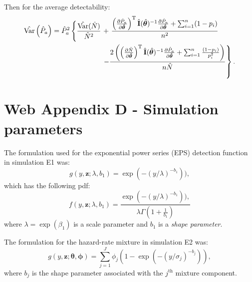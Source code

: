 \documentclass{report}
\begin{document}
Then for the average detectability:
\begin{align*}
\hat{\text{Var}}\left( \hat{P}_a \right) = \hat{P}_a^2\left\{ \vphantom{\frac{\frac{a}{b}^b}{b}} \frac{\hat{\text{Var}}(\hat{N})}{\hat{N}^2}\right. &+\left.\frac{\left(\frac{\partial \hat{P}_a}{\partial\bm{\hat{\theta}}}\right)^\text{T}\hat{\mathbf{I}}(\hat{\bm{\theta}})^{-1}\frac{\partial \hat{P}_a}{\partial\bm{\hat{\theta}}}+\sum_{i=1}^n (1-p_i)}{n^2} \right. \\
 & \left. - \frac{2\left(\left(\frac{\partial \hat{N}}{\partial\bm{\hat{\theta}}}\right)^\text{T}\hat{\mathbf{I}}(\hat{\bm{\theta}})^{-1}\frac{\partial \hat{P}_a}{\partial\bm{\hat{\theta}}}+\sum_{i=1}^n\frac{(1-p_i)}{p_i^2}\right)}{n\hat{N}}\right\}.\\
\end{align*}

\section*{Web Appendix D - Simulation parameters}

The formulation used for the exponential power series (EPS) detection function in simulation E1 was:
\begin{equation*}
g(y,\mathbf{z}; \lambda, b_1) =  \exp(-(y/\lambda)^{-b_1})),
\end{equation*}
which has the following pdf:
\begin{equation*}
f(y,\mathbf{z}; \lambda, b_1) =  \frac{\exp(-(y/\lambda)^{-b_1})),}{\lambda\Gamma(1+\frac{1}{b_1})}
\end{equation*}
where $\lambda=\exp(\beta_1)$ is a scale parameter and $b_1$ is a \textit{shape parameter}.

The formulation for the hazard-rate mixture in simulation E2 was:
\begin{equation*}
g(y,\mathbf{z}; \bm{\theta}, \bm{\phi}) = \sum_{j=1}^J \phi_j (1-\exp(-(y/\sigma_j)^{-b_j})),
\end{equation*}
where $b_j$ is the shape parameter associated with the $j^\text{th}$ mixture component.
\end{document}
